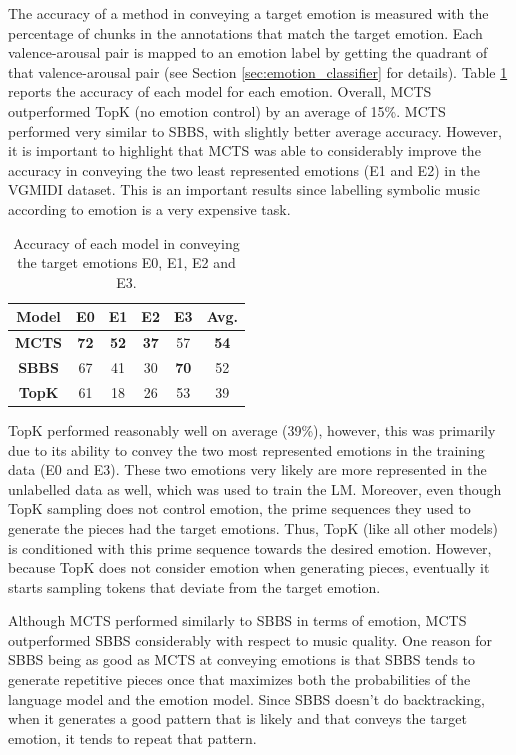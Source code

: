 The accuracy of a method in conveying a target emotion is measured with the percentage of chunks in the annotations that match the target emotion. Each valence-arousal pair is mapped to an emotion label by getting the quadrant of that valence-arousal pair (see Section \ref{sec:emotion_classifier} for details).  Table \ref{tab:emotion} reports the accuracy of each model for each emotion. Overall, MCTS outperformed TopK (no emotion control) by an average of 15\%. MCTS performed very similar to SBBS, with slightly better average accuracy. However, it is important to highlight that MCTS was able to considerably improve the accuracy in conveying the two least represented emotions (E1 and E2) in the VGMIDI dataset. This is an important results since labelling symbolic music according to emotion is a very expensive task.

\begin{table}[h]
    \centering
    \begin{tabular}{cccccc}
    \toprule
    \textbf{Model} & \textbf{E0} & \textbf{E1}  & \textbf{E2} & \textbf{E3} & \textbf{Avg.} \\
    \midrule
    \textbf{MCTS} & \textbf{72} & \textbf{52} & \textbf{37} & 57 & \textbf{54} \\
    \textbf{SBBS} & 67 & 41 & 30 & \textbf{70} & 52 \\
    \textbf{TopK} & 61 & 18 & 26 & 53 & 39 \\
    \bottomrule
    \end{tabular}
    \caption{Accuracy of each model in conveying the target emotions E0, E1, E2 and E3. }
    \label{tab:emotion}
\end{table}

TopK performed reasonably well on average (39\%), however, this was primarily due to its ability to convey the two most represented emotions in the training data (E0 and E3). These two emotions very likely are more represented in the unlabelled data as well, which was used to train the LM. Moreover, even though TopK sampling does not control emotion, the prime sequences they used to generate the pieces had the target emotions. Thus, TopK (like all other models) is conditioned with this prime sequence towards the desired emotion. However, because TopK does not consider emotion when generating pieces, eventually it starts sampling tokens that deviate from the target emotion.

Although MCTS performed similarly to SBBS in terms of emotion, MCTS outperformed SBBS considerably with respect to music quality. One reason for SBBS being as good as MCTS at conveying emotions is that SBBS tends to generate repetitive pieces once that maximizes both the probabilities of the language model and the emotion model. Since SBBS doesn't do backtracking, when it generates a good pattern that is likely and that conveys the target emotion, it tends to repeat that pattern.

